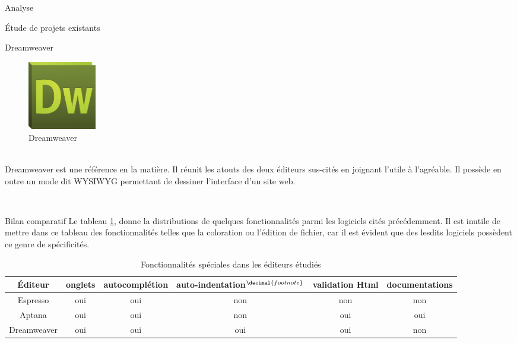 \documentclass[a4paper, 12pt]{report}
\begin{document}
\begin{part}{Analyse}
\begin{chapter}{Étude de projets existants}
\begin{section}{Dreamweaver}
				\begin{figure}[h]
					\begin{center}
						\includegraphics[width=3cm]{images/logoDreamweaver.png}
						\caption{Dreamweaver}
					\end{center}
				\end{figure}~\\
				Dreamweaver est une référence en la matière. Il réunit les atouts des deux éditeurs sus-cités en joignant l'utile à l'agréable.
				Il possède en outre un mode dit \gls{WYSIWYG} permettant de dessiner l'interface d'un site web.
			\end{section}
			~\\


			\begin{section}{Bilan comparatif}
				Le tableau \ref{comparatif}, donne la distributions de quelques fonctionnalités parmi les logiciels cités précédemment. Il est
				inutile de mettre dans ce tableau des fonctionnalités telles que la coloration ou l'édition de fichier, car il est évident que des
				lesdits logiciels possèdent ce genre de spécificités.\\

				\addtocounter{footnote}{1}
				\begin{table}[h]
				\caption{\label{comparatif} Fonctionnalités spéciales dans les éditeurs étudiés}
					\begin{tabular}{|c||c|c|c|c|c|} %
					  \hline
					  Éditeur & onglets & autocomplétion & auto-indentation$^{\decimal{footnote}}$ & validation Html & documentations \\
					  \hline

					  Espresso & oui & oui & non & non & non \\
					  Aptana & oui & oui & non & oui & oui \\
					  Dreamweaver & oui & oui & oui & oui & non \\
					  \hline
					\end{tabular}
				\end{table}


\end{section}
\end{chapter}
\end{part}
\end{document}
